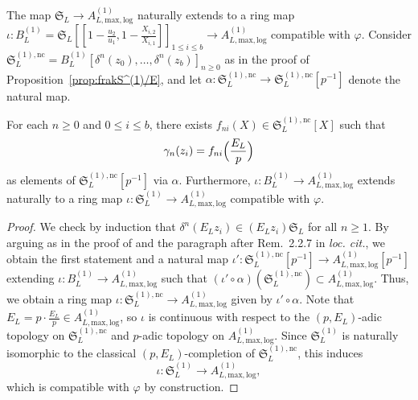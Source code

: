 The map $\mathfrak{S}_L\rightarrow A^{(1)}_{L, \mathrm{max, log}}$ naturally extends to a ring map $\iota\colon B^{(1)}_L= \mathfrak{S}_L[\![1-\frac{u_2}{u_1}, 1-\frac{X_{i, 2}}{X_{i, 1}}]\!]_{1 \leq i \leq b} \rightarrow A^{(1)}_{L, \mathrm{max, log}}$ compatible with $\varphi$. Consider $\mathfrak{S}_L^{(1), \mathrm{nc}} = B^{(1)}_L[\delta^n(z_0),\ldots,\delta^n(z_b)]_{n\geq 0}$ as in the proof of Proposition~\ref{prop:frakS^(1)/E}, and let $\alpha\colon \mathfrak{S}_L^{(1), \mathrm{nc}} \rightarrow \mathfrak{S}_L^{(1), \mathrm{nc}}[p^{-1}]$ denote the natural map.  

\begin{lem} \label{lem:CDVR-gamma(z)}
For each $n \geq 0$ and $0 \leq i \leq b$, there exists $f_{ni}(X) \in \mathfrak{S}_L^{(1), \mathrm{nc}}[X]$ such that
\[
\gamma_n(z_i) = f_{ni}\Bigl(\frac{E_L}{p}\Bigr)
\]
as elements of $\mathfrak{S}_L^{(1), \mathrm{nc}}[p^{-1}]$ via $\alpha$. Furthermore, $\iota\colon B^{(1)}_L \rightarrow A^{(1)}_{L, \mathrm{max, log}}$ extends naturally to a ring map $\iota\colon \mathfrak{S}_L^{(1)} \rightarrow A^{(1)}_{L, \mathrm{max, log}}$ compatible with $\varphi$.
\end{lem}

\begin{proof}
We check by induction that $\delta^n(E_L z_i) \in (E_L z_i) \mathfrak{S}_L$ for all $n \geq 1$.  
By arguing as in the proof of \cite[Lem.~2.2.6]{du-liu-prismaticphiGhatmodule} and the paragraph after Rem.~2.2.7 in \textit{loc. cit.}, we obtain the first statement and a natural map $\iota'\colon \mathfrak{S}_L^{(1), \mathrm{nc}}[p^{-1}] \rightarrow  A^{(1)}_{L, \mathrm{max, log}}[p^{-1}]$ extending $\iota\colon B^{(1)}_L \rightarrow A^{(1)}_{L, \mathrm{max, log}}$ such that $(\iota'\circ \alpha) (\mathfrak{S}_L^{(1), \mathrm{nc}}) \subset A^{(1)}_{L, \mathrm{max, log}}$. Thus, we obtain a ring map $\iota\colon \mathfrak{S}_L^{(1), \mathrm{nc}} \rightarrow A^{(1)}_{L, \mathrm{max, log}}$ given by $\iota'\circ \alpha$. Note that $E_L = p\cdot \frac{E_L}{p} \in A^{(1)}_{L, \mathrm{max, log}}$, so $\iota$ is continuous with respect to the $(p, E_L)$-adic topology on $\mathfrak{S}_L^{(1), \mathrm{nc}}$ and $p$-adic topology on $A^{(1)}_{L, \mathrm{max, log}}$. Since $\mathfrak{S}_L^{(1)}$ is naturally isomorphic to the classical $(p, E_L)$-completion of $\mathfrak{S}_L^{(1), \mathrm{nc}}$, this induces
\[
\iota\colon \mathfrak{S}_L^{(1)} \rightarrow A^{(1)}_{L, \mathrm{max, log}},
\]
which is compatible with $\varphi$ by construction.
\end{proof}

